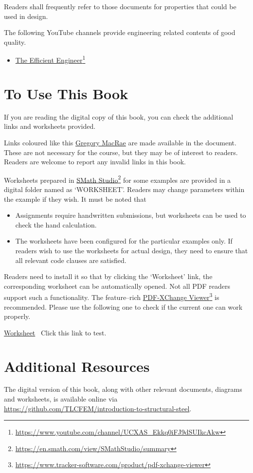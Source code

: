 Readers shall frequently refer to those documents for properties that could be used in design.

The following YouTube channels provide engineering related contents of good quality.
\begin{itemize}
\item \href{https://www.youtube.com/channel/UCXAS_Ekkq0iFJ9dSUIkcAkw}{The Efficient Engineer}\footnote{\url{https://www.youtube.com/channel/UCXAS_Ekkq0iFJ9dSUIkcAkw}}
\end{itemize}
\section{To Use This Book}
If you are reading the digital copy of this book, you can check the additional links and worksheets provided.

Links coloured like this \href{https://www.canterbury.ac.nz/engineering/contact-us/people/gregory-macrae.html}{Gregory MacRae} are made available in the document. These are not necessary for the course, but they may be of interest to readers. Readers are welcome to report any invalid links in this book.

Worksheets prepared in \href{https://en.smath.com/view/SMathStudio/summary}{SMath Studio}\footnote{\url{https://en.smath.com/view/SMathStudio/summary}} for some examples are provided in a digital folder named as `WORKSHEET'. Readers may change parameters within the example if they wish. It must be noted that
\begin{itemize}
\item Assignments require handwritten submissions, but worksheets can be used to check the hand calculation.
\item The worksheets have been configured for the particular examples only. If readers wish to use the worksheets for actual design, they need to ensure that all relevant code clauses are satisfied.
\end{itemize}

Readers need to install it so that by clicking the `Worksheet' link, the corresponding worksheet can be automatically opened. Not all PDF readers support such a functionality. The feature--rich \href{https://www.tracker-software.com/product/pdf-xchange-viewer}{PDF-XChange Viewer}\footnote{\url{https://www.tracker-software.com/product/pdf-xchange-viewer}} is recommended. Please use the following one to check if the current one can work properly.
\begin{exmp}
\href{run:./WORKSHEET/CH00/EX0.TEST.sm}{Worksheet}
\textleftarrow~Click this link to test.
\end{exmp}
\section{Additional Resources}
The digital version of this book, along with other relevant documents, diagrams and worksheets, is available online via \href{https://github.com/TLCFEM/introduction-to-structural-steel}{\url{https://github.com/TLCFEM/introduction-to-structural-steel}}.